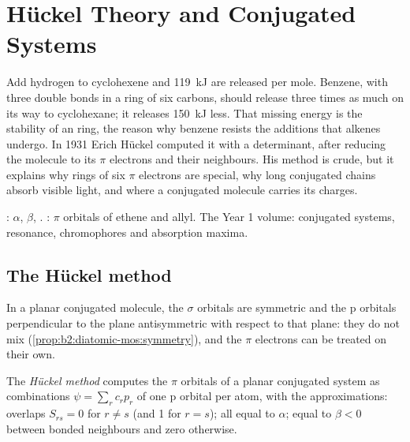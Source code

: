 \chapter{Hückel Theory and Conjugated Systems}\label{ch:b2:huckel}

Add hydrogen to cyclohexene and \qty{119}{kJ} are released per mole. Benzene,
with three double bonds in a ring of six carbons, should release three times
as much on its way to cyclohexane; it releases \qty{150}{kJ} less. That missing
energy is the stability of an  ring, the reason why benzene resists
the additions that alkenes undergo. In 1931 Erich Hückel computed it with a
determinant, after reducing the molecule to its $\pi$ electrons and their
neighbours. His method is crude, but it explains why rings of six $\pi$
electrons are special, why long conjugated chains absorb visible light, and
where a conjugated molecule carries its charges.

\begin{recall}
:  $\alpha$,  $\beta$,
. : $\pi$ orbitals of ethene and
allyl. The Year 1 volume: conjugated systems, resonance, chromophores and
absorption maxima.
\end{recall}

\section{The Hückel method}

In a planar conjugated molecule, the $\sigma$ orbitals are symmetric and the p
orbitals perpendicular to the plane antisymmetric with respect to that plane: they
do not mix (\cref{prop:b2:diatomic-mos:symmetry}), and the $\pi$ electrons can be
treated on their own.

\begin{definition}\label{def:b2:huckel:method}
The \emph{Hückel method} computes the $\pi$ orbitals of a
planar conjugated system as combinations $\psi = \sum_r c_r p_r$ of one p orbital per
atom, with the approximations: overlaps $S_{rs} = 0$ for $r \neq s$ (and 1 for $r =
s$);  all equal to $\alpha$;  equal to $\beta < 0$
between bonded neighbours and zero otherwise.
\end{definition}

